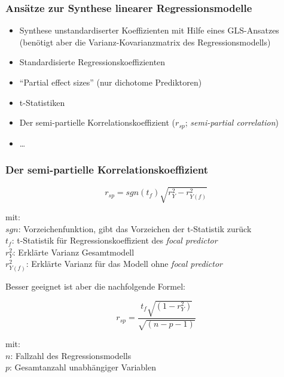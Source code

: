 \begin{frame}
  \frametitle{Ansätze zur Synthese linearer Regressionsmodelle}
  
  \begin{itemize}
  \item Synthese unstandardiserter Koeffizienten mit Hilfe eines GLS-Ansatzes
    (benötigt aber die Varianz-Kovarianzmatrix des Regressionsmodells)
    \citep{becker_synthesis_2007}
  \item Standardisierte Regressionskoeffizienten \citep{kim_standardized_2011}
  \item "`Partial effect sizes"' (nur dichotome Prediktoren) \citep{keef_meta-analysis_2004}
  \item t-Statistiken \citep{stanley_metaregression_1989}
  \item Der semi-partielle Korrelationskoeffizient ($r_{sp}$; \emph{semi-partial correlation}) \citep{aloe_effect_2011, aloe_advances_2011}
  \item \ldots
  \end{itemize}
\end{frame}


\begin{frame}[plain ]
  \frametitle{Der semi-partielle Korrelationskoeffizient}
  
  \begin{equation}
    r_{sp} = sgn(t_f)\sqrt{r^2_Y - r^2_{Y(f)}}
  \end{equation}
  
  mit:\\
  $sgn$: Vorzeichenfunktion, gibt das Vorzeichen der t-Statistik zurück\\
  $t_f$: t-Statistik für Regressionskoeffizient des \emph{focal predictor}\\
  $r^2_Y$: Erklärte Varianz Gesamtmodell \\
  $r^2_{Y(f)}$: Erklärte Varianz für das Modell ohne \emph{focal predictor}
  
  \vspace{2ex}
  Besser geeignet ist aber die nachfolgende Formel:
  
  \begin{equation}
    r_{sp} = \frac{t_f \sqrt{(1-r^2_Y)}}{\sqrt{(n-p-1)}}
  \end{equation}
  
  mit:\\
  $n$: Fallzahl des Regressionsmodells\\
  $p$: Gesamtanzahl unabhängiger Variablen
     
\end{frame}



